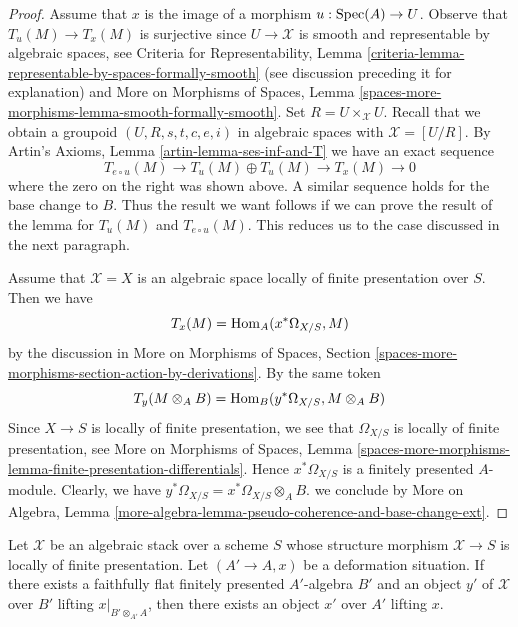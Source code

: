 \begin{proof}
\medskip\noindent
Assume that $x$ is the image of a morphism $u : \mathop{\mathrm{Spec}}(A) \to U$.
Observe that $T_u(M) \to T_x(M)$ is surjective since
$U \to \mathcal{X}$ is smooth and representable by
algebraic spaces, see Criteria for Representability, Lemma
\ref{criteria-lemma-representable-by-spaces-formally-smooth}
(see discussion preceding it for explanation) and
More on Morphisms of Spaces, Lemma
\ref{spaces-more-morphisms-lemma-smooth-formally-smooth}.
Set $R = U \times_\mathcal{X} U$. Recall that we obtain
a groupoid $(U, R, s, t, c, e, i)$ in algebraic spaces with
$\mathcal{X} = [U/R]$. By
Artin's Axioms, Lemma \ref{artin-lemma-ses-inf-and-T}
we have an exact sequence
$$
T_{e \circ u}(M) \to T_u(M) \oplus T_u(M) \to T_x(M) \to 0
$$
where the zero on the right was shown above. A similar sequence
holds for the base change to $B$. Thus the result we want follows if
we can prove the result of the lemma for
$T_u(M)$ and $T_{e \circ u}(M)$. This reduces us to the case discussed
in the next paragraph.

\medskip\noindent
Assume that $\mathcal{X} = X$ is an algebraic space locally of finite
presentation over $S$. Then we have
$$
T_x(M) = \mathop{\mathrm{Hom}}\nolimits_A(x^*\Omega_{X/S}, M)
$$
by the discussion in More on Morphisms of Spaces, Section
\ref{spaces-more-morphisms-section-action-by-derivations}.
By the same token
$$
T_y(M \otimes_A B) = \mathop{\mathrm{Hom}}\nolimits_B(y^*\Omega_{X/S}, M \otimes_A B)
$$
Since $X \to S$ is locally of finite presentation, we see that
$\Omega_{X/S}$ is locally of finite presentation, see
More on Morphisms of Spaces, Lemma
\ref{spaces-more-morphisms-lemma-finite-presentation-differentials}.
Hence $x^*\Omega_{X/S}$ is a finitely presented $A$-module.
Clearly, we have $y^*\Omega_{X/S} = x^*\Omega_{X/S} \otimes_A B$.
we conclude by More on Algebra, Lemma
\ref{more-algebra-lemma-pseudo-coherence-and-base-change-ext}.
\end{proof}

\begin{lemma}
\label{lemma-local-lift-enough}
Let $\mathcal{X}$ be an algebraic stack over a scheme $S$ whose
structure morphism $\mathcal{X} \to S$ is locally of finite presentation.
Let $(A' \to A, x)$ be a deformation situation. If there exists a
faithfully flat finitely presented $A'$-algebra $B'$ and an
object $y'$ of $\mathcal{X}$ over $B'$ lifting $x|_{B' \otimes_{A'} A}$,
then there exists an object $x'$ over $A'$ lifting $x$.
\end{lemma}

